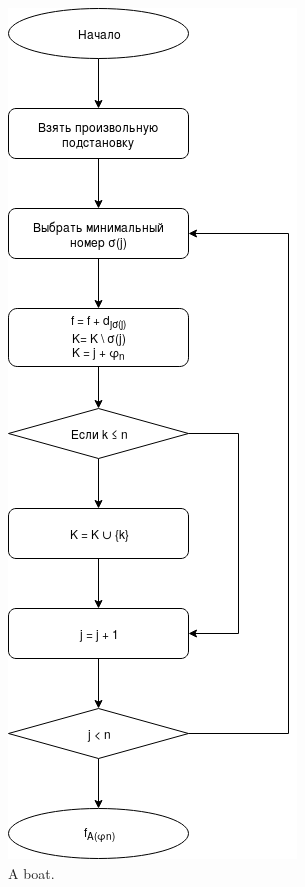 \begin{figure}[hp!]
  \includegraphics[width=\linewidth, height=\textheight,keepaspectratio]{Chapters/image/flowchart.png}
  \caption{A boat.}
  \label{fig:flowchart}
\end{figure}

